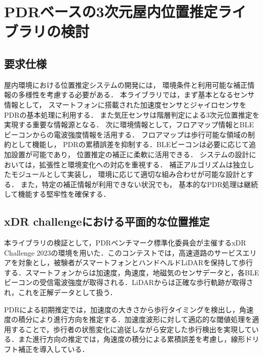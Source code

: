 \documentclass[a4paper, 10pt, twocolumn]{jarticle}
\begin{document}
\section{PDRベースの3次元屋内位置推定ライブラリの検討}


\subsection{要求仕様}
屋内環境における位置推定システムの開発には，
環境条件と利用可能な補正情報の多様性を考慮する必要がある．
本ライブラリでは，まず基本となるセンサ情報として，
スマートフォンに搭載された加速度センサとジャイロセンサをPDRの基本処理に利用する．
また気圧センサは階層判定による3次元位置推定を実現する重要な情報源となる．
次に環境情報として，フロアマップ情報とBLEビーコンからの電波強度情報を活用する．
フロアマップは歩行可能な領域の制約として機能し，
PDRの累積誤差を抑制する．BLEビーコンは必要に応じて追加設置が可能であり，
位置推定の補正に柔軟に活用できる．
システムの設計においては，拡張性と環境変化への対応を重視する．
補正アルゴリズムは独立したモジュールとして実装し，
環境に応じて適切な組み合わせが可能な設計とする．
また，特定の補正情報が利用できない状況でも，
基本的なPDR処理は継続して機能する堅牢性を確保する．




\subsection{xDR challengeにおける平面的な位置推定}

本ライブラリの検証として，PDRベンチマーク標準化委員会が主催するxDR Challenge 2023の環境を用いた．このコンテストでは，高速道路のサービスエリアを対象とし，被験者がスマートフォンとハンドヘルドLiDARを保持して歩行する．スマートフォンからは加速度，角速度，地磁気のセンサデータと，各BLEビーコンの受信電波強度が取得される．LiDARからは正確な歩行軌跡が取得され，これを正解データとして扱う．

PDRによる初期推定では，加速度の大きさから歩行タイミングを検出し，角速度の積分により進行方向を推定する．加速度波形に対して適応的な閾値処理を適用することで，歩行者の状態変化に追従しながら安定した歩行検出を実現している．また進行方向の推定では，角速度の積分による累積誤差を考慮し，線形ドリフト補正を導入している．
\end{document}
